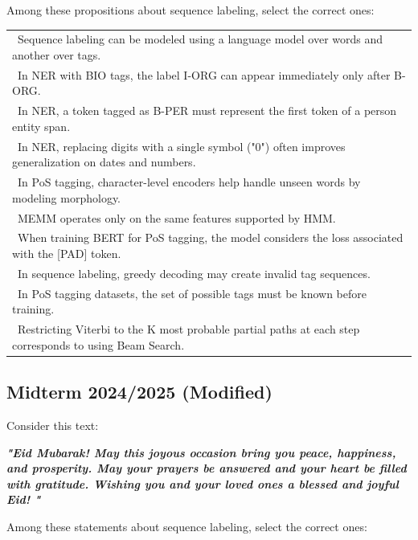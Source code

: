 \documentclass{../extra/aakpract/aakpract}
\begin{document}
	Among these propositions about sequence labeling, select the correct ones:
	
	\begin{longtable}{|p{}|}
		\hline 
		\Square\ Sequence labeling can be modeled using a language model over words and another over tags.\\
		\Square\ In NER with BIO tags, the label I-ORG can appear immediately only after B-ORG. \\
		\Square\ In NER, a token tagged as B-PER must represent the first token of a person entity span.\\
		\Square\ In NER, replacing digits with a single symbol ("0") often improves generalization on dates and numbers.\\
		\Square\ In PoS tagging, character-level encoders help handle unseen words by modeling morphology.\\
		\Square\ MEMM operates only on the same features supported by HMM.\\
		\Square\ When training BERT for PoS tagging, the model considers the loss associated with the [PAD] token.\\
		\Square\ In sequence labeling, greedy decoding may create invalid tag sequences.\\
		\Square\ In PoS tagging datasets, the set of possible tags must be known before training.\\
		\Square\ Restricting Viterbi to the K most probable partial paths at each step corresponds to using Beam Search.\\
		\hline
	\end{longtable}
	
	\newpage
	\subsection{Midterm 2024/2025 (Modified)}
	
	Consider this text: 
	
	\textbf{\small\itshape"Eid Mubarak! May this joyous occasion bring you peace, happiness, and prosperity. May your prayers be answered and your heart be filled with gratitude. Wishing you and your loved ones a blessed and joyful Eid! "}
	
	Among these statements about sequence labeling, select the correct ones:
	
\end{document}
